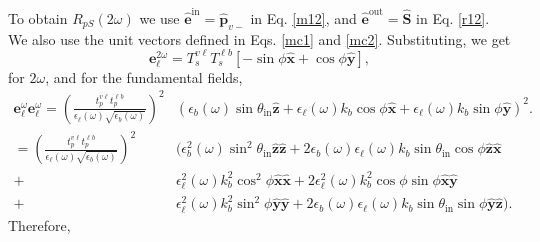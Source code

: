 To obtain $R_{pS}(2\omega)$ we use
$\hat{\mathbf{e}}^{\mathrm{in}}=\hat{\mathbf{p}}_{v-}$ in Eq. \eqref{m12}, and
$\hat{\mathbf{e}}^{\mathrm{out}}=\hat{\mathbf{S}}$ in Eq. \eqref{r12}. We also use
the unit vectors defined in Eqs. \eqref{mc1} and
\eqref{mc2}. Substituting, we get
\begin{equation*}
\mathbf{e}^{2\omega}_{\ell} 
= T^{v\ell}_{s}T^{\ell b}_{s}
\left[-\sin\phi\hat{\mathbf{x}} + \cos\phi\hat{\mathbf{y}}\right],
\end{equation*}
for $2\omega$, and for the fundamental fields,
\begin{align*}
\mathbf{e}^{\omega}_{\ell}\mathbf{e}^{\omega}_{\ell}
= \left(
\frac{t^{v\ell}_{p}t^{\ell b}_{p}}
       {\epsilon_{\ell}(\omega)\sqrt{\epsilon_{b}(\omega)}}
\right)^{2}
&\left(
  \epsilon_{b}(\omega)\sin\theta_{\mathrm{in}}\hat{\mathbf{z}}
+ \epsilon_{\ell}(\omega)k_{b}\cos\phi\hat{\mathbf{x}}
+ \epsilon_{\ell}(\omega)k_{b}\sin\phi\hat{\mathbf{y}}
\right)^{2}.\\
= \left(
\frac{t^{v\ell}_{p}t^{\ell b}_{p}}
       {\epsilon_{\ell}(\omega)\sqrt{\epsilon_{b}(\omega)}}
\right)^{2}
&\big(
  \epsilon_{b}^{2}(\omega)\sin^{2}\theta_{\mathrm{in}}
  \hat{\mathbf{z}}\hat{\mathbf{z}}
+ 2\epsilon_{b}(\omega)\epsilon_{\ell}(\omega)k_{b}\sin\theta_{\mathrm{in}}
   \cos\phi\hat{\mathbf{z}}\hat{\mathbf{x}}\\
+ &\epsilon^{2}_{\ell}(\omega)k^{2}_{b}\cos^{2}\phi
   \hat{\mathbf{x}}\hat{\mathbf{x}}
+ 2\epsilon^{2}_{\ell}(\omega)k^{2}_{b}\cos\phi\sin\phi
   \hat{\mathbf{x}}\hat{\mathbf{y}}\\
+ &\epsilon^{2}_{\ell}(\omega)k^{2}_{b}\sin^{2}\phi
   \hat{\mathbf{y}}\hat{\mathbf{y}}
+ 2\epsilon_{b}(\omega)\epsilon_{\ell}(\omega)k_{b}\sin\theta_{\mathrm{in}}
  \sin\phi
   \hat{\mathbf{y}}\hat{\mathbf{z}}
\big).
\end{align*}
Therefore,
